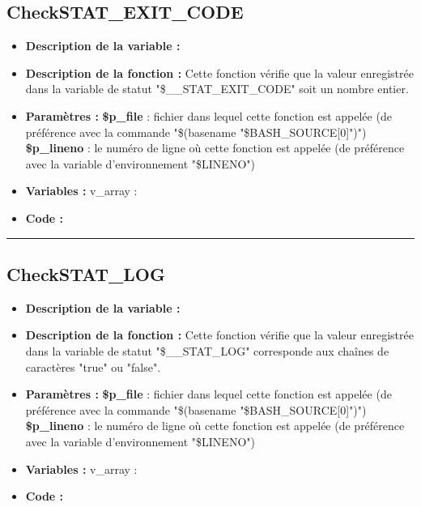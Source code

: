 \documentclass[a4paper,10pt]{article}
\begin{document}
\subsection{CheckSTAT\_EXIT\_CODE}\color{white}
\begin{itemize}
    \item \textbf{Description de la variable :}

    \item \textbf{Description de la fonction :} Cette fonction vérifie que la valeur enregistrée dans la variable de statut "\$\_\_STAT\_EXIT\_CODE" soit un nombre entier.

    \item \textbf{Paramètres :}
        \color{orange}\textbf{\$p\_file}\color{white} : fichier dans lequel cette fonction est appelée (de préférence avec la commande "\$(\color{gray}basename \color{white}"\color{orange}\$BASH\_SOURCE[0]\color{white}")")
    \color{orange}\textbf{\$p\_lineno}\color{white} : le numéro de ligne où cette fonction est appelée (de préférence avec la variable d'environnement "\color{orange}\$LINENO\color{white}")

    \item \textbf{Variables :} v\_array :

    \item \textbf{Code :}
\end{itemize}



\color{green}\par\noindent\rule{\textwidth}{0.4pt}\color{white}

\color{green}
\subsection{CheckSTAT\_LOG}\color{white}
\begin{itemize}
    \item \textbf{Description de la variable :}

    \item \textbf{Description de la fonction :} Cette fonction vérifie que la valeur enregistrée dans la variable de statut "\$\_\_STAT\_LOG" corresponde aux chaînes de caractères "true" ou "false".

    \item \textbf{Paramètres :}
        \color{orange}\textbf{\$p\_file}\color{white} : fichier dans lequel cette fonction est appelée (de préférence avec la commande "\$(\color{gray}basename \color{white}"\color{orange}\$BASH\_SOURCE[0]\color{white}")")
    \color{orange}\textbf{\$p\_lineno}\color{white} : le numéro de ligne où cette fonction est appelée (de préférence avec la variable d'environnement "\color{orange}\$LINENO\color{white}")

    \item \textbf{Variables :} v\_array :

    \item \textbf{Code :}
\end{itemize}
\end{document}
